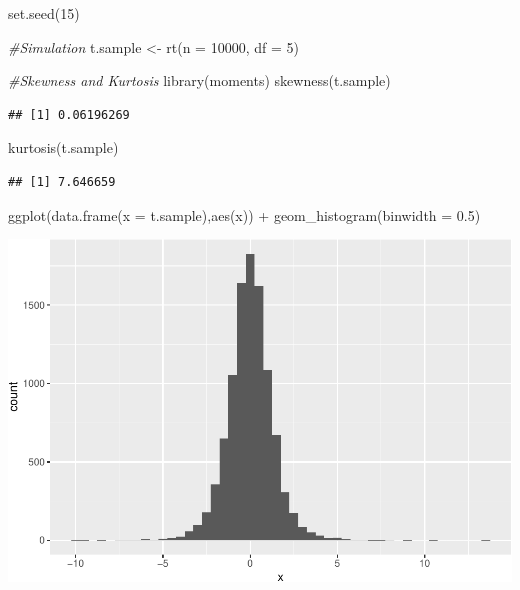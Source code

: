 \documentclass[landscape, 20pt]{extreport}
\newenvironment{Shaded}{\begin{snugshade}}{\end{snugshade}}
\newcommand{\AttributeTok}[1]{\textcolor[rgb]{0.77,0.63,0.00}{#1}}
\newcommand{\CommentTok}[1]{\textcolor[rgb]{0.56,0.35,0.01}{\textit{#1}}}
\newcommand{\DecValTok}[1]{\textcolor[rgb]{0.00,0.00,0.81}{#1}}
\newcommand{\FloatTok}[1]{\textcolor[rgb]{0.00,0.00,0.81}{#1}}
\newcommand{\FunctionTok}[1]{\textcolor[rgb]{0.00,0.00,0.00}{#1}}
\newcommand{\NormalTok}[1]{#1}
\newcommand{\OtherTok}[1]{\textcolor[rgb]{0.56,0.35,0.01}{#1}}
\newcommand{\SpecialCharTok}[1]{\textcolor[rgb]{0.00,0.00,0.00}{#1}}
\theoremstyle{definition}
\theoremstyle{definition}
\theoremstyle{definition}
\theoremstyle{definition}
\theoremstyle{remark}
\begin{document}
\begin{Shaded}
\begin{Highlighting}[]
\FunctionTok{set.seed}\NormalTok{(}\DecValTok{15}\NormalTok{)}

\CommentTok{\#Simulation}
\NormalTok{t.sample }\OtherTok{\textless{}{-}} \FunctionTok{rt}\NormalTok{(}\AttributeTok{n =} \DecValTok{10000}\NormalTok{, }\AttributeTok{df =} \DecValTok{5}\NormalTok{)}

\CommentTok{\#Skewness and Kurtosis}
\FunctionTok{library}\NormalTok{(moments)}
\FunctionTok{skewness}\NormalTok{(t.sample)}
\end{Highlighting}
\end{Shaded}

\begin{verbatim}
## [1] 0.06196269
\end{verbatim}

\begin{Shaded}
\begin{Highlighting}[]
\FunctionTok{kurtosis}\NormalTok{(t.sample)}
\end{Highlighting}
\end{Shaded}

\begin{verbatim}
## [1] 7.646659
\end{verbatim}

\begin{Shaded}
\begin{Highlighting}[]
\FunctionTok{ggplot}\NormalTok{(}\FunctionTok{data.frame}\NormalTok{(}\AttributeTok{x =}\NormalTok{ t.sample),}\FunctionTok{aes}\NormalTok{(x)) }\SpecialCharTok{+} \FunctionTok{geom\_histogram}\NormalTok{(}\AttributeTok{binwidth =} \FloatTok{0.5}\NormalTok{)}
\end{Highlighting}
\end{Shaded}

\includegraphics{unnamed-chunk-5-1.pdf}
\end{document}
